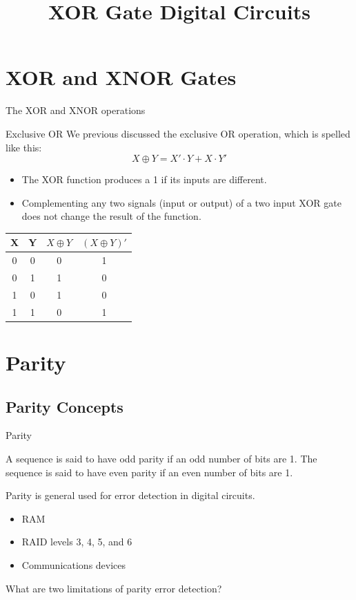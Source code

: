 \title{XOR Gate Digital Circuits}

\section{XOR and XNOR Gates}

\begin{frame}{The XOR and XNOR operations}
  \begin{block}{Exclusive OR}
    We previous discussed the exclusive OR operation, which is spelled like this:
    $$X \oplus Y = X' \cdot Y + X \cdot Y'$$
    \begin{itemize}
      \item The XOR function produces a 1 if its inputs are different.
      \item Complementing any two signals (input or output) of a two input XOR gate does not change the result of the function.
    \end{itemize}
  \end{block}
  \begin{center}
    \begin{tabular}{cc|cc}
      X & Y & $X \oplus Y$ & $(X \oplus Y)'$ \\
      \hline
      0 & 0 & 0 & 1 \\
      0 & 1 & 1 & 0 \\
      1 & 0 & 1 & 0 \\
      1 & 1 & 0 & 1 \\
    \end{tabular}
  \end{center}
\end{frame}

\section{Parity}

\subsection{Parity Concepts}

\begin{frame}{Parity}
  \begin{definition}
    A sequence is said to have \alert{odd parity} if an odd number of bits are 1.  The sequence is said to have \alert{even parity} if an even number of bits are 1.
  \end{definition}
  Parity is general used for error detection in digital circuits.
  \begin{itemize}
    \item RAM
    \item RAID levels 3, 4, 5, and 6
    \item Communications devices
  \end{itemize}
  What are two limitations of parity error detection?
\end{frame}

